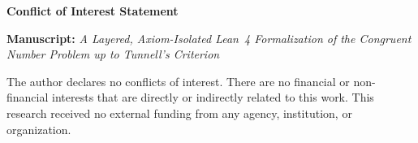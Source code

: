 \documentclass[11pt,a4paper]{article}
\begin{document}
\thispagestyle{empty}

\begin{center}
{\large\bfseries Conflict of Interest Statement}
\end{center}

\bigskip

\noindent
\textbf{Manuscript:} \emph{A Layered, Axiom-Isolated Lean~4
Formalization of the Congruent Number Problem up to Tunnell's
Criterion}

\bigskip

\noindent
The author declares no conflicts of interest.
There are no financial or non-financial interests that are directly
or indirectly related to this work.
This research received no external funding from any agency,
institution, or organization.
\end{document}
